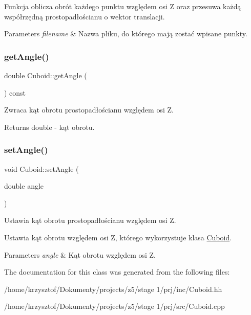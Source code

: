 Funkcja oblicza obrót każdego punktu względem osi Z oraz przesuwa każdą współrzędną prostopadłościanu o wektor translacji.


\begin{DoxyParams}{Parameters}
{\em filename} & Nazwa pliku, do którego mają zostać wpisane punkty. \\
\hline
\end{DoxyParams}
\mbox{\label{class_cuboid_a1996331a8a2eaa699e11e5acf62bd79f}} 
\subsubsection{\texorpdfstring{get\+Angle()}{getAngle()}}
{\footnotesize\ttfamily double Cuboid\+::get\+Angle (\begin{DoxyParamCaption}{ }\end{DoxyParamCaption}) const\hspace{0.3cm}{\ttfamily [inline]}}



Zwraca kąt obrotu prostopadłościanu względem osi Z. 

\begin{DoxyReturn}{Returns}
double -\/ kąt obrotu. 
\end{DoxyReturn}
\mbox{\label{class_cuboid_a22093add11b2e04a5bb84eaa773bcadf}} 
\subsubsection{\texorpdfstring{set\+Angle()}{setAngle()}}
{\footnotesize\ttfamily void Cuboid\+::set\+Angle (\begin{DoxyParamCaption}\item[{double}]{angle }\end{DoxyParamCaption})\hspace{0.3cm}{\ttfamily [inline]}}



Ustawia kąt obrotu prostopadłościanu względem osi Z. 

Ustawia kąt obrotu względem osi Z, którego wykorzystuje klasa \hyperlink{class_cuboid}{Cuboid}.


\begin{DoxyParams}{Parameters}
{\em angle} & Kąt obrotu względem osi Z. \\
\hline
\end{DoxyParams}


The documentation for this class was generated from the following files\+:\begin{DoxyCompactItemize}
\item 
/home/krzysztof/\+Dokumenty/projects/z5/stage 1/prj/inc/Cuboid.\+hh\item 
/home/krzysztof/\+Dokumenty/projects/z5/stage 1/prj/src/Cuboid.\+cpp\end{DoxyCompactItemize}
